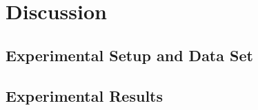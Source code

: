 
\chapter{Discussion} %
\label{Chapter4}


\section{Experimental Setup and Data Set}
\section{Experimental Results}
